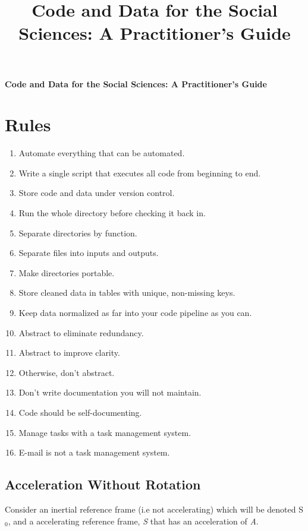 \documentclass[11pt]{article}
\theoremstyle{definition}
\begin{document}
\title{Code and Data for the Social Sciences: A Practitioner's Guide}



\begin{center}
{\LARGE \bf Code and Data for the Social Sciences: A Practitioner's Guide}\\
\end{center}


\section{Rules}

\begin{enumerate}
\item Automate everything that can be automated.
\item Write a single script that executes all code from beginning to end.

\item Store code and data under version control. 
\item Run the whole directory before checking it back in.

\item Separate directories by function. 
\item Separate files into inputs and outputs. 
\item Make directories portable.

\item Store cleaned data in tables with unique, non-missing keys. 
\item Keep data normalized as far into your code pipeline as you can.

\item Abstract to eliminate redundancy. 
\item Abstract to improve clarity. 
\item Otherwise, don’t abstract.

\item Don’t write documentation you will not maintain. 
\item Code should be self-documenting.

\item Manage tasks with a task management system. 
\item E-mail is not a task management system.


\end{enumerate}
\subsection{Acceleration Without Rotation}
Consider an inertial reference frame (i.e not accelerating) which will be denoted S$_0$, and a accelerating reference frame, \textit{S} that has an acceleration of \textit{A}. 
\end{document}
